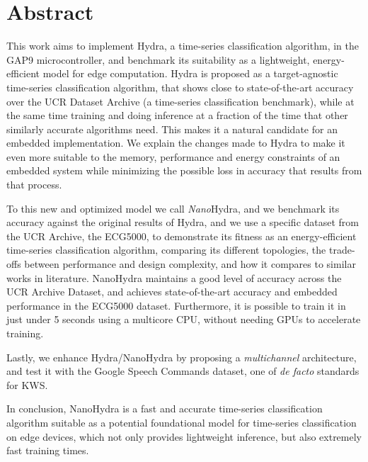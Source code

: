 \chapter*{Abstract}

This work aims to implement Hydra, a time-series classification algorithm, in the GAP9 microcontroller, and benchmark its suitability
as a lightweight, energy-efficient model for edge computation. Hydra is proposed as a target-agnostic time-series classification algorithm, that
shows close to state-of-the-art accuracy over the UCR Dataset Archive (a time-series classification benchmark), while at the same time training and 
doing inference at a fraction of the time that other similarly accurate algorithms need. This makes it a natural candidate for an embedded implementation.
We explain the changes made to Hydra to make it even more suitable to the memory, performance and energy constraints of an embedded system  while minimizing
the possible loss in accuracy that results from that process. 

To this new and optimized model we call \emph{Nano}Hydra, and we benchmark its accuracy against 
the original results of Hydra, and we use a specific dataset from the UCR Archive, the ECG5000, to demonstrate its fitness as an energy-efficient time-series classification
algorithm, comparing its different topologies, the trade-offs between performance and design complexity, and how it compares to similar works in literature.
NanoHydra maintains a good level of accuracy across the UCR Archive Dataset, and achieves state-of-the-art accuracy and embedded performance in the ECG5000 dataset. 
Furthermore, it is possible to train it in just under 5 seconds using a multicore CPU, without needing GPUs to accelerate training. 

Lastly, we enhance Hydra/NanoHydra by proposing a \emph{multichannel} architecture, and test it with the Google Speech Commands dataset, one of \emph{de facto} standards for KWS.

In conclusion, NanoHydra is a fast and accurate time-series classification algorithm suitable as a potential foundational model for time-series classification on edge devices, which not only provides lightweight inference, but also
extremely fast training times.

